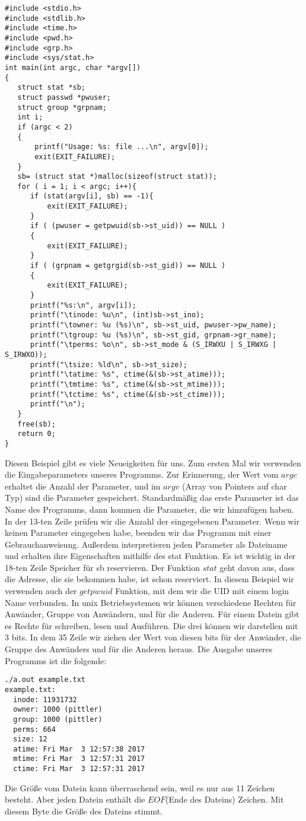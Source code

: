 \documentclass{article}[12pt]
\begin{document}
\begin{lstlisting}
#include <stdio.h>
#include <stdlib.h>
#include <time.h>
#include <pwd.h>
#include <grp.h>
#include <sys/stat.h>
int main(int argc, char *argv[])
{
   struct stat *sb;
   struct passwd *pwuser;
   struct group *grpnam;
   int i;
   if (argc < 2)
   {
       printf("Usage: %s: file ...\n", argv[0]);
       exit(EXIT_FAILURE);
   }
   sb= (struct stat *)malloc(sizeof(struct stat));
   for ( i = 1; i < argc; i++){
      if (stat(argv[i], sb) == -1){
          exit(EXIT_FAILURE);
      }
      if ( (pwuser = getpwuid(sb->st_uid)) == NULL )
      {
          exit(EXIT_FAILURE);
      }
      if ( (grpnam = getgrgid(sb->st_gid)) == NULL )
      {
          exit(EXIT_FAILURE);
      }
      printf("%s:\n", argv[i]);
      printf("\tinode: %u\n", (int)sb->st_ino);
      printf("\towner: %u (%s)\n", sb->st_uid, pwuser->pw_name);
      printf("\tgroup: %u (%s)\n", sb->st_gid, grpnam->gr_name);
      printf("\tperms: %o\n", sb->st_mode & (S_IRWXU | S_IRWXG | S_IRWXO));
      printf("\tsize: %ld\n", sb->st_size);
      printf("\tatime: %s", ctime(&(sb->st_atime)));
      printf("\tmtime: %s", ctime(&(sb->st_mtime)));
      printf("\tctime: %s", ctime(&(sb->st_ctime)));
      printf("\n");
   }
   free(sb);
   return 0;
}
\end{lstlisting}
Diesen Beispiel gibt es viele Neueigkeiten für uns. Zum ersten Mal wir verwenden die Eingabeparameters unseres 
Programms. Zur Erinnerung, der Wert vom $argc$ erhaltet die Anzahl der Parameter, und im $argv$ (Array von Pointers auf
char Typ) sind die Parameter gespeichert. Standardmäßig das erste Parameter ist das Name des Programms, dann kommen
die Parameter, die wir hinzufügen haben. In der 13-ten Zeile prüfen wir die Anzahl der eingegebenen Parameter. Wenn
wir keinen Parameter eingegeben habe, beenden wir das Programm mit einer Gebrauchanweisung. Außerdem interpretieren 
jeden Parameter als Dateiname und erhalten ihre Eigenschaften mithilfe des stat Funktion. Es ist wichtig in der 18-ten
Zeile Speicher für sb reservieren. Der Funktion $stat$ geht davon aus, dass die Adresse, die sie bekommen habe, ist
schon reserviert. In diesem Beispiel wir verwenden auch der $getpwuid$ Funktion, mit dem wir die UID mit einem login 
Name verbunden. In unix Betriebsystemen wir können verschiedene Rechten für Anwänder, Gruppe von Anwändern, und für die
Anderen. Für einem Datein gibt es Rechte für schreiben, lesen und Ausführen. Die drei können wir darstellen mit 3 bits.
In dem 35 Zeile wir ziehen der Wert von diesen bits für der Anwänder, die Gruppe des Anwänders und für die Anderen heraus.
Die Ausgabe unseres Programms ist die folgende:
\begin{lstlisting}
./a.out example.txt
example.txt:
  inode: 11931732
  owner: 1000 (pittler)
  group: 1000 (pittler)
  perms: 664
  size: 12
  atime: Fri Mar  3 12:57:38 2017
  mtime: Fri Mar  3 12:57:31 2017
  ctime: Fri Mar  3 12:57:31 2017
\end{lstlisting}
Die Größe vom Datein kann überraschend sein, weil es nur aus 11 Zeichen besteht. Aber jeden Datein enthält die 
$EOF$(Ende des Dateins) Zeichen. Mit diesem Byte die Größe des Dateins stimmt.
\end{document}
